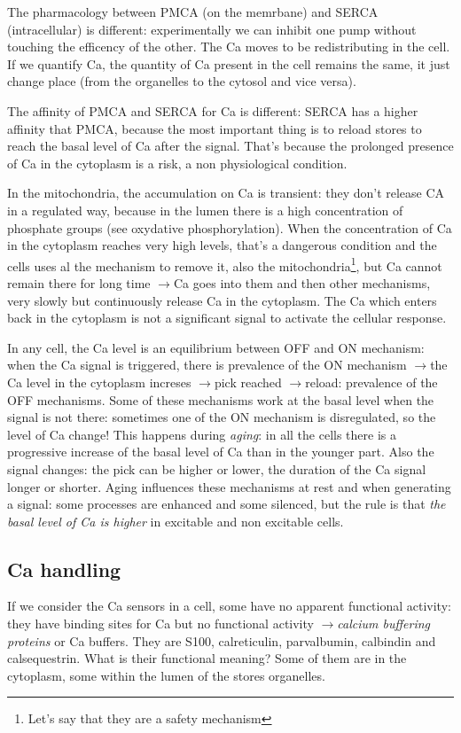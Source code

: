 \documentclass[a4paper, 12pt]{book}
\newcommand{\lfreccia}{\ensuremath{\longrightarrow}}
\begin{document}
The pharmacology between PMCA (on the memrbane) and SERCA (intracellular) is different: experimentally we can inhibit one pump without touching the efficency of the other. The Ca moves to be redistributing in the cell. If we quantify Ca, the quantity of Ca present in the cell remains the same, it just change place (from the organelles to the cytosol and vice versa).

The affinity of PMCA and SERCA for Ca is different: SERCA has a higher affinity that PMCA, because the most important thing is to reload stores to reach the basal level of Ca after the signal. That's because the prolonged presence of Ca in the cytoplasm is a risk, a non physiological condition.

In the mitochondria, the accumulation on Ca is transient: they don't release CA in a regulated way, because in the lumen there is a high concentration of phosphate groups (see oxydative phosphorylation). When the concentration of Ca in the cytoplasm reaches very high levels, that's a dangerous condition and the cells uses al the mechanism to remove it, also the mitochondria\footnote{Let's say that they are a safety mechanism}, but Ca cannot remain there for long time \lfreccia Ca goes into them and then other mechanisms, very slowly but continuously release Ca in the cytoplasm. The Ca which enters back in the cytoplasm is not a significant signal to activate the cellular response.

In any cell, the Ca level is an equilibrium between OFF and ON mechanism: when the Ca signal is triggered, there is  prevalence of the ON mechanism \lfreccia the Ca level in the cytoplasm increses \lfreccia pick reached \lfreccia reload: prevalence of the OFF mechanisms. Some of these mechanisms work at the basal level when the signal is not there: sometimes one of the ON mechanism is disregulated, so the level of Ca change! This happens during \emph{aging}: in all the cells there is a progressive increase of the basal level of Ca than in the younger part. Also the signal changes: the pick can be higher or lower, the duration of the Ca signal longer or shorter. Aging influences these mechanisms at rest and when generating a signal: some processes are enhanced and some silenced, but the rule is that \emph{the basal level of Ca is higher} in excitable and non excitable cells.

\subsection{Ca handling}
If we consider the Ca sensors in a cell, some have no apparent functional activity: they have binding sites for Ca but no functional activity \lfreccia \emph{calcium buffering proteins} or Ca buffers. They are S100, calreticulin, parvalbumin, calbindin and calsequestrin. What is their functional meaning? Some of them are in the cytoplasm, some within the lumen of the stores organelles. 
\end{document}

